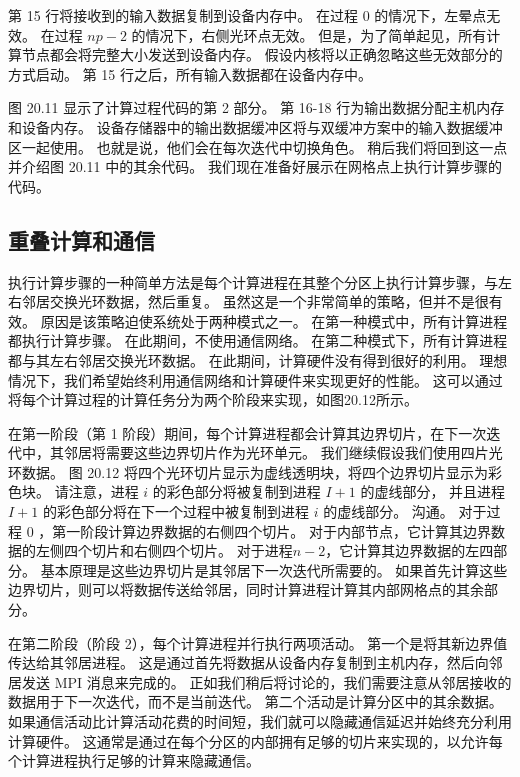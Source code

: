 第 15 行将接收到的输入数据复制到设备内存中。 在过程 0 的情况下，左晕点无效。 在过程 $n p-2$ 的情况下，右侧光环点无效。 
但是，为了简单起见，所有计算节点都会将完整大小发送到设备内存。 假设内核将以正确忽略这些无效部分的方式启动。 
第 15 行之后，所有输入数据都在设备内存中。

图 20.11 显示了计算过程代码的第 2 部分。 第 16-18 行为输出数据分配主机内存和设备内存。 
设备存储器中的输出数据缓冲区将与双缓冲方案中的输入数据缓冲区一起使用。 
也就是说，他们会在每次迭代中切换角色。 稍后我们将回到这一点并介绍图 20.11 中的其余代码。 
我们现在准备好展示在网格点上执行计算步骤的代码。

\subsection{重叠计算和通信}
执行计算步骤的一种简单方法是每个计算进程在其整个分区上执行计算步骤，与左右邻居交换光环数据，然后重复。 
虽然这是一个非常简单的策略，但并不是很有效。 原因是该策略迫使系统处于两种模式之一。 
在第一种模式中，所有计算进程都执行计算步骤。 在此期间，不使用通信网络。 
在第二种模式下，所有计算进程都与其左右邻居交换光环数据。 在此期间，计算硬件没有得到很好的利用。 
理想情况下，我们希望始终利用通信网络和计算硬件来实现更好的性能。 
这可以通过将每个计算过程的计算任务分为两个阶段来实现，如图20.12所示。

在第一阶段（第 1 阶段）期间，每个计算进程都会计算其边界切片，在下一次迭代中，其邻居将需要这些边界切片作为光环单元。 
我们继续假设我们使用四片光环数据。 图 20.12 将四个光环切片显示为虚线透明块，将四个边界切片显示为彩色块。 
请注意，进程 $i$ 的彩色部分将被复制到进程 $I+1$ 的虚线部分，
并且进程 $I+1$ 的彩色部分将在下一个过程中被复制到进程 $i$ 的虚线部分。 
沟通。 对于过程 0 ，第一阶段计算边界数据的右侧四个切片。 对于内部节点，它计算其边界数据的左侧四个切片和右侧四个切片。 
对于进程$n-2$，它计算其边界数据的左四部分。 基本原理是这些边界切片是其邻居下一次迭代所需要的。 
如果首先计算这些边界切片，则可以将数据传送给邻居，同时计算进程计算其内部网格点的其余部分。

在第二阶段（阶段 2），每个计算进程并行执行两项活动。 第一个是将其新边界值传达给其邻居进程。 
这是通过首先将数据从设备内存复制到主机内存，然后向邻居发送 MPI 消息来完成的。 
正如我们稍后将讨论的，我们需要注意从邻居接收的数据用于下一次迭代，而不是当前迭代。 第二个活动是计算分区中的其余数据。 
如果通信活动比计算活动花费的时间短，我们就可以隐藏通信延迟并始终充分利用计算硬件。 
这通常是通过在每个分区的内部拥有足够的切片来实现的，以允许每个计算进程执行足够的计算来隐藏通信。

